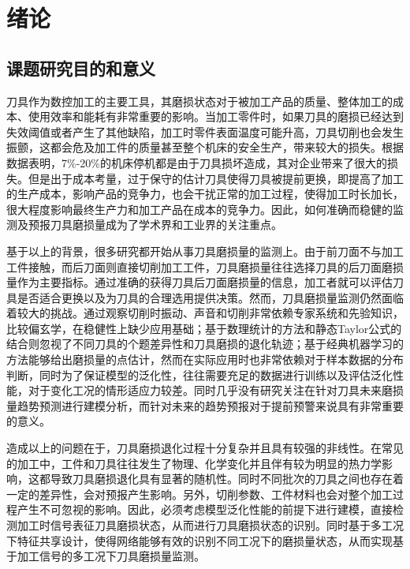 \chapter{绪论}
\section{课题研究目的和意义}

刀具作为数控加工的主要工具，其磨损状态对于被加工产品的质量、整体加工的成本、使用效率和能耗有非常重要的影响。当加工零件时，如果刀具的磨损已经达到失效阈值或者产生了其他缺陷，加工时零件表面温度可能升高，刀具切削也会发生振颤，这都会危及加工件的质量甚至整个机床的安全生产，带来较大的损失。根据数据\cite{kegg1984one,kurada1997review}表明，7\%-20\%的机床停机都是由于刀具损坏造成，其对企业带来了很大的损失。但是出于成本考量，过于保守的估计刀具使得刀具被提前更换，即提高了加工的生产成本，影响产品的竞争力，也会干扰正常的加工过程，使得加工时长加长，很大程度影响最终生产力和加工产品在成本的竞争力。因此，如何准确而稳健的监测及预报刀具磨损量成为了学术界和工业界的关注重点。

基于以上的背景，很多研究都开始从事刀具磨损量的监测上。由于前刀面不与加工工件接触，而后刀面则直接切削加工工件，刀具磨损量往往选择刀具的后刀面磨损量作为主要指标。通过准确的获得刀具后刀面磨损量的信息，加工者就可以评估刀具是否适合更换以及为刀具的合理选用提供决策。然而，刀具磨损量监测仍然面临着较大的挑战。通过观察切削时振动、声音和切削非常依赖专家系统和先验知识，比较偏玄学，在稳健性上缺少应用基础；基于数理统计的方法和静态Taylor公式\cite{marksberry2008comprehensive}的结合则忽视了不同刀具的个题差异性和刀具磨损的退化轨迹；基于经典机器学习的方法能够给出磨损量的点估计，然而在实际应用时也非常依赖对于样本数据的分布判断，同时为了保证模型的泛化性，往往需要充足的数据进行训练以及评估泛化性能，对于变化工况的情形适应力较差\cite{si2017data}。同时几乎没有研究关注在针对刀具未来磨损量趋势预测进行建模分析，而针对未来的趋势预报对于提前预警来说具有非常重要的意义。

造成以上的问题在于，刀具磨损退化过程十分复杂并且具有较强的非线性。在常见的加工中，工件和刀具往往发生了物理、化学变化并且伴有较为明显的热力学影响，这都导致刀具磨损退化具有显著的随机性。同时不同批次的刀具之间也存在着一定的差异性，会对预报产生影响。另外，切削参数、工件材料也会对整个加工过程产生不可忽视的影响\cite{liang2017experimental}。因此，必须考虑模型泛化性能的前提下进行建模，直接检测加工时信号表征刀具磨损状态，从而进行刀具磨损状态的识别。同时基于多工况下特征共享设计，使得网络能够有效的识别不同工况下的磨损量状态，从而实现基于加工信号的多工况下刀具磨损量监测。

